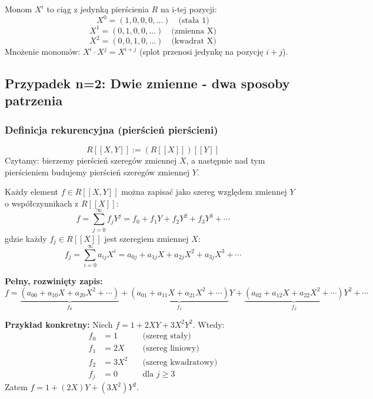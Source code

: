 \begin{eg}[Monom $X^i$ dla n=1]
Monom $X^i$ to ciąg z jedynką pierścienia $R$ na i-tej pozycji:
\[
X^0 = (1, 0, 0, 0, \dots) \quad \text{(stała 1)}
\]
\[
X^1 = (0, 1, 0, 0, \dots) \quad \text{(zmienna X)}
\]
\[
X^2 = (0, 0, 1, 0, \dots) \quad \text{(kwadrat X)}
\]
Mnożenie monomów: $X^i \cdot X^j = X^{i+j}$ (splot przenosi jedynkę na pozycję $i+j$).
\end{eg}

\begin{center}
\end{center}

\subsection{Przypadek n=2: Dwie zmienne - dwa sposoby patrzenia}

\subsubsection{Definicja rekurencyjna (pierścień pierścieni)}

\[
R[[X,Y]] := (R[[X]])[[Y]]
\]
Czytamy: bierzemy pierścień szeregów zmiennej $X$, a następnie nad tym pierścieniem budujemy pierścień szeregów zmiennej $Y$.


\begin{eg}
Każdy element $f \in R[[X,Y]]$ można zapisać jako szereg względem zmiennej $Y$ o współczynnikach z $R[[X]]$:
\[
f = \sum_{j=0}^\infty f_j Y^j = f_0 + f_1Y + f_2Y^2 + f_3Y^3 + \cdots
\]
gdzie każdy $f_j \in R[[X]]$ jest szeregiem zmiennej $X$:
\[
f_j = \sum_{i=0}^\infty a_{ij} X^i = a_{0j} + a_{1j}X + a_{2j}X^2 + a_{3j}X^3 + \cdots
\]

\textbf{Pełny, rozwinięty zapis:}
\[
f = \underbrace{(a_{00} + a_{10}X + a_{20}X^2 + \cdots)}_{f_0} + \underbrace{(a_{01} + a_{11}X + a_{21}X^2 + \cdots)}_{f_1}Y + \underbrace{(a_{02} + a_{12}X + a_{22}X^2 + \cdots)}_{f_2}Y^2 + \cdots
\]

\textbf{Przykład konkretny:} Niech $f = 1 + 2XY + 3X^2Y^2$. Wtedy:
\begin{align*}
f_0 &= 1 \quad &\text{(szereg stały)} \\
f_1 &= 2X \quad &\text{(szereg liniowy)} \\
f_2 &= 3X^2 \quad &\text{(szereg kwadratowy)} \\
f_j &= 0 \quad &\text{dla } j \geq 3
\end{align*}
Zatem $f = 1 + (2X)Y + (3X^2)Y^2$.
\end{eg}

